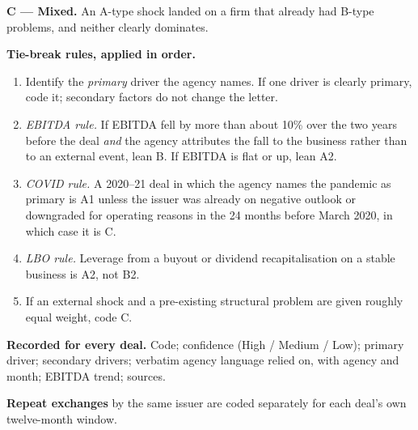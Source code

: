 \documentclass[12pt]{article}
\begin{document}
\noindent\textbf{C --- Mixed.} An A-type shock landed on a firm that already had B-type problems, and neither clearly dominates.

\medskip\noindent\textbf{Tie-break rules, applied in order.}
\begin{enumerate}
  \item Identify the \emph{primary} driver the agency names. If one driver is clearly primary, code it; secondary factors do not change the letter.
  \item \emph{EBITDA rule.} If EBITDA fell by more than about 10\% over the two years before the deal \emph{and} the agency attributes the fall to the business rather than to an external event, lean B. If EBITDA is flat or up, lean A2.
  \item \emph{COVID rule.} A 2020--21 deal in which the agency names the pandemic as primary is A1 unless the issuer was already on negative outlook or downgraded for operating reasons in the 24 months before March 2020, in which case it is C.
  \item \emph{LBO rule.} Leverage from a buyout or dividend recapitalisation on a stable business is A2, not B2.
  \item If an external shock and a pre-existing structural problem are given roughly equal weight, code C.
\end{enumerate}

\noindent\textbf{Recorded for every deal.} Code; confidence (High / Medium / Low); primary driver; secondary drivers; verbatim agency language relied on, with agency and month; EBITDA trend; sources.

\noindent\textbf{Repeat exchanges} by the same issuer are coded separately for each deal's own twelve-month window.
\end{document}
